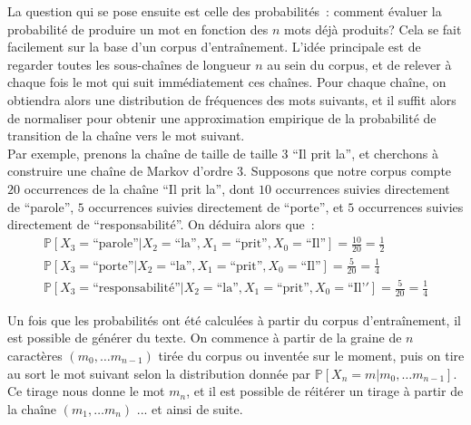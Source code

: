 \documentclass{article}
\begin{document}
				La question qui se pose ensuite est celle des probabilités~: comment évaluer la probabilité de produire un mot en fonction des $n$ mots déjà produits? Cela se fait facilement sur la base d'un corpus d'entraînement. L'idée principale est de regarder toutes les sous-chaînes de longueur $n$ au sein du corpus, et de relever à chaque fois le mot qui suit immédiatement ces chaînes. Pour chaque chaîne, on obtiendra alors une distribution de fréquences des mots suivants, et il suffit alors de normaliser pour obtenir une approximation empirique de la probabilité de transition de la chaîne vers le mot suivant.\\
				
				Par exemple, prenons la chaîne de taille de taille $3$ ``Il prit la'', et cherchons à construire une chaîne de Markov d'ordre $3$. Supposons que notre corpus compte $20$ occurrences de la chaîne ``Il prit la'', dont $10$ occurrences suivies directement de ``parole'', $5$ occurrences suivies directement de ``porte'', et $5$ occurrences suivies directement de ``responsabilité''. On déduira alors que~:
				\begin{eqnarray}
					\mathbb{P}[X_3 = \mbox{``parole''} | X_2 = \mbox{``la''}, X_1 = \mbox{``prit''}, X_0 = \mbox{``Il''}] = \frac{10}{20} = \frac{1}{2}\\
					\mathbb{P}[X_3 = \mbox{``porte''} | X_2 = \mbox{``la''}, X_1 = \mbox{``prit''}, X_0 = \mbox{``Il''}] = \frac{5}{20} = \frac{1}{4}\\
					\mathbb{P}[X_3 = \mbox{``responsabilité''} | X_2 = \mbox{``la''}, X_1 = \mbox{``prit''}, X_0 = \mbox{``Il'}'] = \frac{5}{20} = \frac{1}{4}
				\end{eqnarray}
				
				Un fois que les probabilités ont été calculées à partir du corpus d'entraînement, il est possible de générer du texte. On commence à partir de la graine de $n$ caractères $(m_0, \dots m_{n-1})$ tirée du corpus ou inventée sur le moment, puis on tire au sort le mot suivant selon la distribution donnée par $\mathbb{P}[X_n = m| m_0, \dots m_{n-1}]$. Ce tirage nous donne le mot $m_n$, et il est possible de réitérer un tirage à partir de la chaîne $(m_1, \dots m_n)$ ... et ainsi de suite.\\
				
\end{document}
